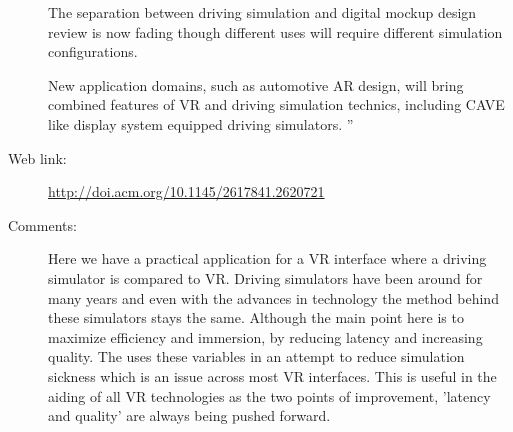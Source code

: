 \documentclass{scrartcl}
\begin{document}
\begin{description}
		The separation between driving simulation and digital mockup design review is now fading though different uses will require different simulation configurations.
		
		New application domains, such as automotive AR design, will bring combined features of VR and driving simulation technics, including CAVE like display system equipped driving simulators.
		''
		\item[Web link:] \url{http://doi.acm.org/10.1145/2617841.2620721}
		\item[Comments:] Here we have a practical application for a VR interface where a driving simulator is compared to VR. Driving simulators have been around for many years and even with the advances in technology the method behind these simulators stays the same. Although the main point here is to maximize efficiency and immersion, by reducing latency and increasing quality. The uses these variables in an attempt to reduce simulation sickness which is an issue across most VR interfaces. This is useful in the aiding of all VR technologies as the two points of improvement, 'latency and quality' are always being pushed forward.
	\end{description}
	
\end{document}
